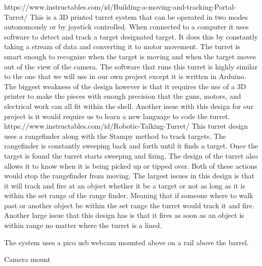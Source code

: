 https://www.instructables.com/id/Building-a-moving-and-tracking-Portal-Turret/
This is a 3D printed turret system that can be operated in two modes autonomously or by joystick controlled. When connected to a computer it uses software to detect and track a target designated target. It does this by constantly taking a stream of data and converting it to motor movement. The turret is smart enough to recognize when the target is moving and when the target moves out of the view of the camera.  The software that runs this turret is highly similar to the one that we will use in our own project except it is written in Arduino. 
	The biggest weakness of the design however is that it requires the use of a 3D printer to make the pieces with enough precision that the guns, motors, and  electrical work can all fit within the shell. Another issue with this design for our project is it would require us to learn a new language to code the turret.  
https://www.instructables.com/id/Robotic-Talking-Turret/
This turret design uses a rangefinder along with the Stampy method to track targets. The rangefinder is constantly sweeping back and forth until it finds a target. Once the target is found the turret starts sweeping and firing. The design of the turret also allows it to know when it is being picked up or tipped over. Both of these actions would stop the rangefinder from moving. 
The largest issues in this design is that it will track and fire at an object whether it be a target or not as long as it is within the set range of the range finder. Meaning that if someone where to walk past or another object be within the set range the turret would track it and fire. Another large issue that this design has is that it fires as soon as an object is within range no matter where the turret is a lined.





The system uses a pico usb webcam mounted above on a rail above the barrel.

Camera mount

